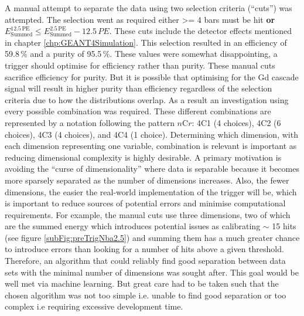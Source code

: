 A manual attempt to separate the data using two selection criteria (``cuts'') was attempted. The selection went as required either >= 4 bars must be hit \textbf{or} $E^{12.5\,\textrm{PE}}_\textrm{Summed} \leq E^{2.5\,\textrm{PE}}_\textrm{Summed} - 12.5\,PE$. These cuts include the detector effects mentioned in chapter \ref{chp:GEANT4Simulation}. This selection resulted in an efficiency of 59.8\,\% and a purity of 95.5\,\%. These values were somewhat disappointing, a trigger should optimise for efficiency rather than purity. These manual cuts sacrifice efficiency for purity. But it is possible that optimising for the Gd cascade signal will result in higher purity than efficiency regardless of the selection criteria due to how the distributions overlap. As a result an investigation using every possible combination was required. These different combinations are represented by a notation following the pattern $n$C$r$: 4C1 (4 choices), 4C2 (6 choices), 4C3 (4 choices), and 4C4 (1 choice). Determining which dimension, with each dimension representing one variable, combination is relevant is important as reducing dimensional complexity is highly desirable. A primary motivation is avoiding the ``curse of dimensionality'' \cite{taylor2019applications_cofD} where data is separable because it becomes more sparsely separated as the number of dimensions increases. Also, the fewer dimensions, the easier the real-world implementation of the trigger will be, which is important to reduce sources of potential errors and minimise computational requirements. For example, the manual cuts use three dimensions, two of which are the summed energy which introduces potential issues as calibrating $\sim$ 15 hits (see figure \ref{subFig:preTrigNba2.5}) and summing them has a much greater chance to introduce errors than looking for a number of hits above a given threshold. Therefore, an algorithm that could reliably find good separation between data sets with the minimal number of dimensions was sought after. This goal would be well met via machine learning. But great care had to be taken such that the chosen algorithm was not too simple i.e. unable to find good separation or too complex i.e requiring excessive development time. 
